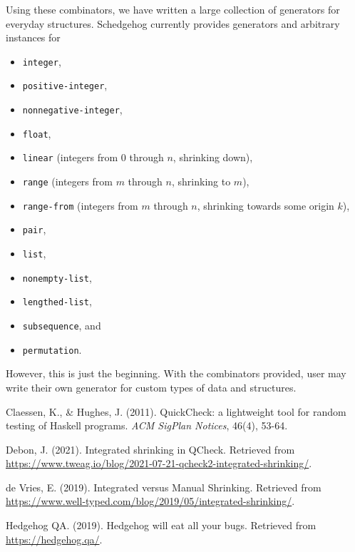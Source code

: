 \documentclass{scrartcl}
\begin{document}
Using these combinators, we have written a large collection of
generators for everyday structures.
Schedgehog currently provides generators and arbitrary instances for
\begin{itemize}
  \item \verb|integer|,
  \item \verb|positive-integer|,
  \item \verb|nonnegative-integer|,
  \item \verb|float|,
  \item \verb|linear| (integers from \(0\) through \(n\), shrinking down),
  \item \verb|range| (integers from \(m\) through \(n\), shrinking to \(m\)),
  \item \verb|range-from| (integers from \(m\) through \(n\),
                           shrinking towards some origin \(k\)),
  \item \verb|pair|,
  \item \verb|list|,
  \item \verb|nonempty-list|,
  \item \verb|lengthed-list|,
  \item \verb|subsequence|, and
  \item \verb|permutation|.
\end{itemize}
However, this is just the beginning.
With the combinators provided, user may write their own
generator for custom types of data and structures.




\begin{thebibliography}{99}

Claessen, K., \& Hughes, J. (2011). QuickCheck: a lightweight tool for random
testing of Haskell programs. \textit{ACM SigPlan Notices}, 46(4), 53-64.

Debon, J. (2021). Integrated shrinking in QCheck. Retrieved from
\url{https://www.tweag.io/blog/2021-07-21-qcheck2-integrated-shrinking/}.

de Vries, E. (2019). Integrated versus Manual Shrinking. Retrieved from
\url{https://www.well-typed.com/blog/2019/05/integrated-shrinking/}.

Hedgehog QA. (2019). Hedgehog will eat all your bugs. Retrieved from
\url{https://hedgehog.qa/}.

\end{thebibliography}
\end{document}
